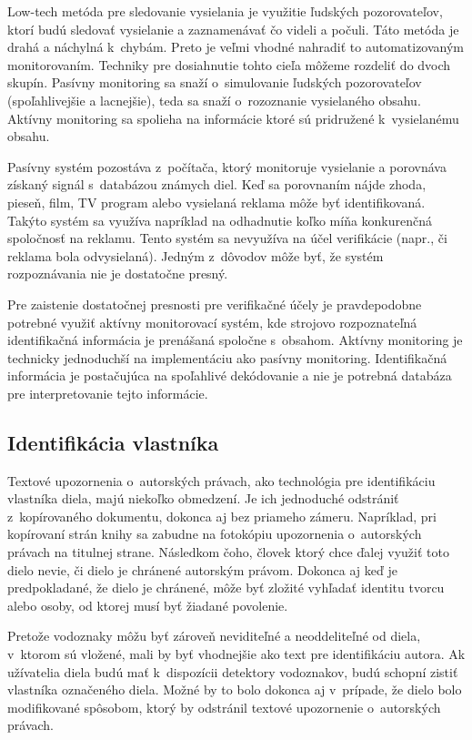 Low-tech metóda pre sledovanie vysielania je využitie ľudských pozorovateľov, ktorí budú sledovať vysielanie a zaznamenávať čo videli a počuli. Táto metóda je drahá a náchylná k~chybám. Preto je veľmi vhodné nahradiť to automatizovaným monitorovaním. Techniky pre dosiahnutie tohto cieľa môžeme rozdeliť do dvoch skupín. Pasívny monitoring sa snaží o~simulovanie ľudských pozorovateľov (spoľahlivejšie a lacnejšie), teda sa snaží o~rozoznanie vysielaného obsahu. Aktívny monitoring sa spolieha na informácie ktoré sú pridružené k~vysielanému obsahu.

Pasívny systém pozostáva z~počítača, ktorý monitoruje vysielanie a porovnáva získaný signál s~databázou známych  diel. Keď sa porovnaním nájde zhoda, pieseň, film, TV program alebo vysielaná reklama môže byť identifikovaná. Takýto systém sa využíva napríklad na odhadnutie koľko míňa konkurenčná spoločnosť na reklamu. Tento systém sa nevyužíva na účel verifikácie (napr., či reklama bola odvysielaná). Jedným z~dôvodov môže byť, že systém rozpoznávania nie je dostatočne presný.

Pre zaistenie dostatočnej presnosti pre verifikačné účely je pravdepodobne potrebné využiť aktívny monitorovací systém, kde strojovo rozpoznateľná identifikačná informácia je prenášaná spoločne s~obsahom. Aktívny monitoring je technicky jednoduchší na implementáciu ako pasívny monitoring. Identifikačná informácia je postačujúca na spoľahlivé dekódovanie a nie je potrebná databáza pre interpretovanie tejto informácie. \cite{Cox}

\subsection{Identifikácia vlastníka}
Textové upozornenia o~autorských právach, ako technológia pre identifikáciu vlastníka diela, majú niekoľko obmedzení. Je ich jednoduché odstrániť z~kopírovaného dokumentu, dokonca aj bez priameho zámeru. Napríklad, pri kopírovaní strán knihy sa zabudne na fotokópiu upozornenia o~autorských právach na titulnej strane. Následkom čoho, človek ktorý chce ďalej využiť toto dielo nevie, či dielo je chránené autorským právom. Dokonca aj keď je predpokladané, že dielo je chránené, môže byť zložité vyhľadať identitu tvorcu alebo osoby, od ktorej musí byť žiadané povolenie.

Pretože vodoznaky môžu byť zároveň neviditeľné a neoddeliteľné od diela, v~ktorom sú vložené, mali by byť vhodnejšie ako text pre identifikáciu autora. Ak užívatelia diela budú mať k~dispozícii detektory vodoznakov, budú schopní zistiť vlastníka označeného diela. Možné by to bolo dokonca aj v~prípade, že dielo bolo modifikované spôsobom, ktorý by odstránil textové upozornenie o~autorských právach.

